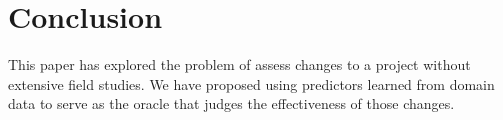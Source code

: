 \documentclass[conference]{IEEEtran}
\begin{document}
 




%


\section{Conclusion}
 
This paper has explored the problem of assess changes to a project without
extensive field studies. We have proposed using predictors learned from domain data
to serve as the oracle that judges the effectiveness of those changes.
\end{document}
